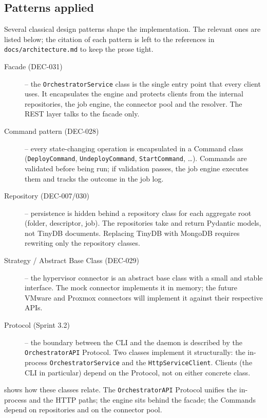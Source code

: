 \subsection{Patterns applied}
\label{subsec:patterns}

Several classical design patterns shape the implementation. The
relevant ones are listed below; the citation of each pattern is left
to the references in \texttt{docs/architecture.md} to keep the
prose tight.

\begin{description}
  \item[Facade (DEC-031)] -- the \texttt{OrchestratorService} class
        is the single entry point that every client uses. It
        encapsulates the engine and protects clients from the
        internal repositories, the job engine, the connector pool
        and the resolver. The REST layer talks to the facade only.
  \item[Command pattern (DEC-028)] -- every state-changing operation
        is encapsulated in a Command class (\texttt{DeployCommand},
        \texttt{UndeployCommand}, \texttt{StartCommand}, \dots).
        Commands are validated before being run; if validation
        passes, the job engine executes them and tracks the
        outcome in the job log.
  \item[Repository (DEC-007/030)] -- persistence is hidden behind a
        repository class for each aggregate root (folder, descriptor,
        job). The repositories take and return Pydantic models, not
        TinyDB documents. Replacing TinyDB with MongoDB requires
        rewriting only the repository classes.
  \item[Strategy / Abstract Base Class (DEC-029)] -- the
        hypervisor connector is an abstract base class with a small
        and stable interface. The mock connector implements it
        in memory; the future VMware and Proxmox connectors will
        implement it against their respective APIs.
  \item[Protocol (Sprint 3.2)] -- the boundary between the CLI and
        the daemon is described by the \texttt{OrchestratorAPI}
        Protocol. Two classes implement it structurally: the
        in-process \texttt{OrchestratorService} and the
        \texttt{HttpServiceClient}. Clients (the CLI in particular)
        depend on the Protocol, not on either concrete class.
\end{description}

 shows how these classes relate. The
\texttt{OrchestratorAPI} Protocol unifies the in-process and the
HTTP paths; the engine sits behind the facade; the Commands depend
on repositories and on the connector pool.

